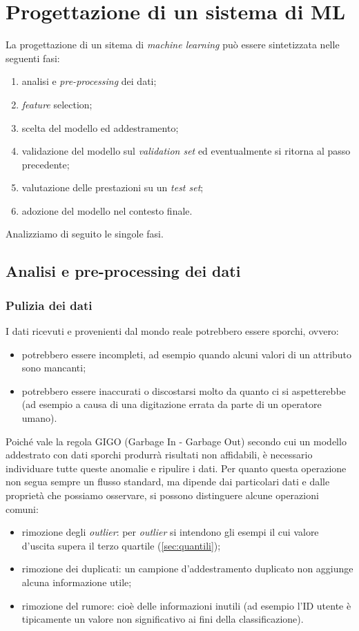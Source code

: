 \section{Progettazione di un sistema di ML}

La progettazione di un sitema di \emph{machine learning} può essere sintetizzata nelle seguenti fasi:
\begin{enumerate}
\item analisi e \emph{pre-processing} dei dati;
\item \emph{feature} selection;
\item scelta del modello ed addestramento;
\item validazione del modello sul \emph{validation set} ed eventualmente si ritorna al passo precedente;
\item valutazione delle prestazioni su un \emph{test set};
\item adozione del modello nel contesto finale.
\end{enumerate}
Analizziamo di seguito le singole fasi.

\subsection{Analisi e pre-processing dei dati}
\subsubsection{Pulizia dei dati}
I dati ricevuti e provenienti dal mondo reale potrebbero essere sporchi, ovvero:
\begin{itemize}
\item potrebbero essere incompleti, ad esempio quando alcuni valori di un attributo sono mancanti;
\item potrebbero essere inaccurati o discostarsi molto da quanto ci si aspetterebbe (ad esempio a causa di una digitazione errata da parte di un operatore umano).
\end{itemize}
Poiché vale la regola GIGO (Garbage In - Garbage Out) secondo cui un modello addestrato con dati sporchi produrrà risultati non affidabili, è necessario individuare tutte queste anomalie e ripulire i dati. Per quanto questa operazione non segua sempre un flusso standard, ma dipende dai particolari dati e dalle proprietà che possiamo osservare, si possono distinguere alcune operazioni comuni:
\begin{itemize}
\item rimozione degli \emph{outlier}: per \emph{outlier} si intendono gli esempi il cui valore d'uscita supera il terzo quartile (\autoref{sec:quantili});
\item rimozione dei duplicati: un campione d'addestramento duplicato non aggiunge alcuna informazione utile;
\item rimozione del rumore: cioè delle informazioni inutili (ad esempio l'ID utente è tipicamente un valore non significativo ai fini della classificazione).
\end{itemize}

